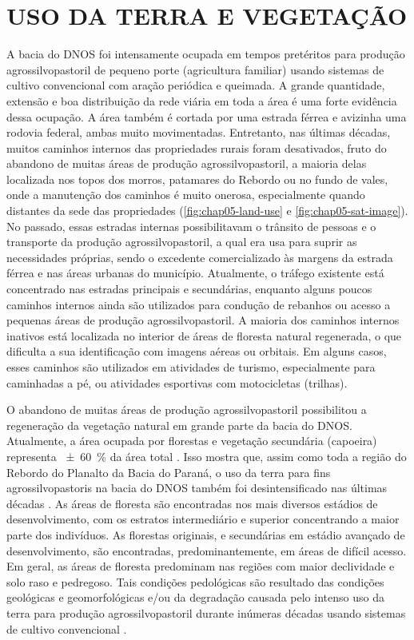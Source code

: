 \section{USO DA TERRA E VEGETAÇÃO}
\label{sec:chap03-landuse}

A bacia do DNOS foi intensamente ocupada em tempos pretéritos para produção agrossilvopastoril de pequeno 
porte (agricultura familiar) usando sistemas de cultivo convencional com aração periódica e queimada. A grande 
quantidade, extensão e boa distribuição da rede viária em toda a área é uma forte evidência dessa ocupação. A 
área também é cortada por uma estrada férrea e avizinha uma rodovia federal, ambas muito movimentadas. 
Entretanto, nas últimas décadas, muitos caminhos internos das propriedades rurais foram desativados, fruto do 
abandono de muitas áreas de produção agrossilvopastoril, a maioria delas localizada nos topos dos morros, 
patamares do Rebordo ou no fundo de vales, onde a manutenção dos caminhos é muito onerosa, especialmente 
quando distantes da sede das propriedades (\autoref{fig:chap05-land-use} e \autoref{fig:chap05-sat-image}). No 
passado, essas estradas internas possibilitavam o trânsito de pessoas e o transporte da produção 
agrossilvopastoril, a qual era usa para suprir as necessidades próprias, sendo o excedente comercializado às 
margens da estrada férrea e nas áreas urbanas do município. Atualmente, o tráfego existente está concentrado 
nas estradas principais e secundárias, enquanto alguns poucos caminhos internos ainda são utilizados para 
condução de rebanhos ou acesso a pequenas áreas de produção agrossilvopastoril. A maioria dos caminhos internos 
inativos está localizada no interior de áreas de floresta natural regenerada, o que dificulta a sua 
identificação com imagens aéreas ou orbitais. Em alguns casos, esses caminhos são utilizados em atividades de 
turismo, especialmente para caminhadas a pé, ou atividades esportivas com motocicletas (trilhas).

O abandono de muitas áreas de produção agrossilvopastoril possibilitou a regeneração da vegetação natural em 
grande parte da bacia do DNOS. Atualmente, a área ocupada por florestas e vegetação secundária (capoeira) 
representa \SI{\pm60}{\percent} da área total \cite{SamuelRosaEtAl2011a}. Isso mostra que, assim como toda a 
região do Rebordo do Planalto da Bacia do Paraná, o uso da terra para fins agrossilvopastoris na bacia do DNOS 
também foi desintensificado nas últimas décadas \cite{SEMA/UFSM2001, DillEtAl2004, Poelking2007, Miguel2010, 
SamuelRosaEtAl2011a, Dullius2012, TenCatenEtAl2012}. As áreas de floresta são encontradas nos mais diversos 
estádios de desenvolvimento, com os estratos intermediário e superior concentrando a maior parte dos 
indivíduos. As florestas originais, e secundárias em estádio avançado de desenvolvimento, são encontradas, 
predominantemente, em áreas de difícil acesso. Em geral, as áreas de floresta predominam nas regiões com maior 
declividade e solo raso e pedregoso. Tais condições pedológicas são resultado das condições geológicas e 
geomorfológicas e/ou da degradação causada pelo intenso uso da terra para produção agrossilvopastoril durante 
inúmeras décadas usando sistemas de cultivo convencional \cite{SamuelRosaEtAl2011a}.

